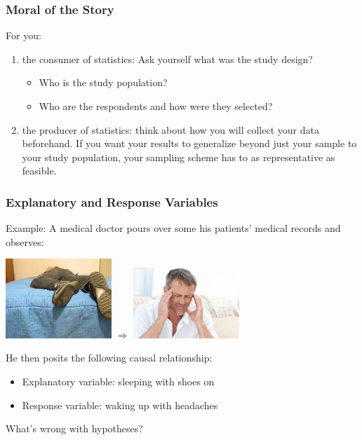 \documentclass[handout]{beamer}
\newcommand{\blue}[1]{\textcolor{blue2}{#1}}
\begin{document}
\begin{frame}
\frametitle{Moral of the Story}
For you:
\begin{enumerate}
\pause \item \blue{the consumer of statistics}: Ask yourself what was the study design?
\begin{itemize}
\item Who is the study population?
\item Who are the respondents and how were they selected?
\end{itemize}
\pause \item \blue{the producer of statistics}:  think about \blue{how} you will collect your data beforehand. If you want your results to generalize \blue{beyond} just your sample to your study population, your sampling scheme has to as representative as feasible.
\end{enumerate}

\end{frame}



\begin{frame}
\frametitle{Explanatory and Response Variables}
Example: A medical doctor pours over some his patients' medical records and observes:

\begin{center}
\includegraphics[width=0.3\textwidth]{./figure/shoes.jpg}
\hspace{1cm}
$\Longrightarrow$
\hspace{1cm}
\includegraphics[width=0.3\textwidth]{./figure/headache.jpg}
\end{center}

\pause He then posits the following \blue{causal} relationship:
\begin{itemize}
  \pause \item \blue{Explanatory variable}: sleeping with shoes on 
  \pause \item \blue{Response variable}: waking up with headaches
\end{itemize}

\pause What's wrong with hypotheses?
\end{frame}
\end{document}
